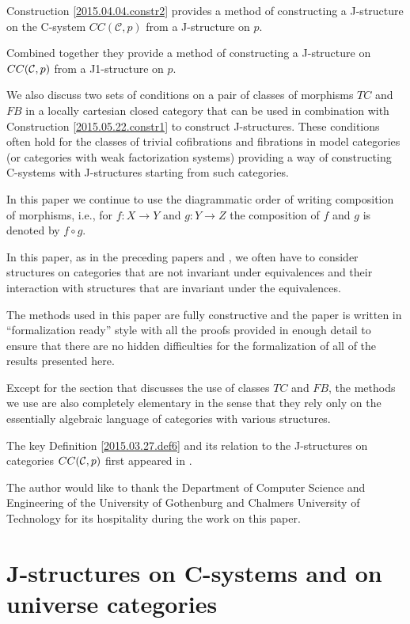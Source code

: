 \documentclass[12pt]{article}
\newcommand{\sr}{\rightarrow}
\begin{document}
Construction \ref{2015.04.04.constr2} provides a method of constructing a J-structure on the C-system $CC({\mathcal C},p)$ from a J-structure on $p$.

Combined together they provide a method of constructing a J-structure on $CC({\cal C},p)$ from a J1-structure on $p$.

We also discuss two sets of conditions on a pair of classes of morphisms $TC$ and $FB$ in a locally cartesian closed category that can be used in combination with Construction \ref{2015.05.22.constr1} to construct J-structures. These conditions often hold for the classes of trivial cofibrations and fibrations in model categories (or categories with weak factorization systems) providing a way of constructing C-systems with J-structures starting from such categories. 

In this paper we continue to use the diagrammatic order of writing composition of morphisms, i.e., for $f:X\sr Y$ and $g:Y\sr Z$ the composition of $f$ and $g$ is denoted by $f\circ g$.

In this paper, as in the preceding papers \cite{Cfromauniverse} and \cite{fromunivwithPi}, we often have to consider structures on categories that are not invariant under equivalences and their interaction with structures that are invariant under the equivalences. 

The methods used in this paper are fully constructive and the paper is written in ``formalization ready'' style with all the proofs provided in enough detail to ensure that there are no hidden difficulties for the formalization of all of the results presented here.

Except for the section that discusses the use of classes $TC$ and $FB$, the methods we use are also completely elementary in the sense that they rely only on the essentially algebraic language of categories with various structures. 

The key Definition \ref{2015.03.27.def6} and its relation to the J-structures on categories $CC({\cal C},p)$ first appeared in \cite{CMUtalk}. 

The author would like to thank the Department of Computer Science and Engineering of the University of Gothenburg and Chalmers University of Technology for its hospitality during the work on this paper. 


\section{J-structures on C-systems and on universe categories}
\end{document}
